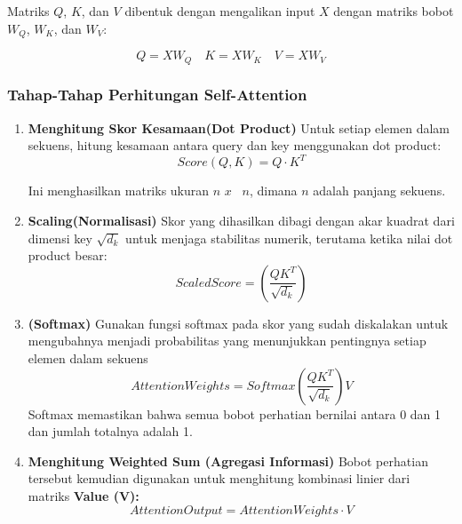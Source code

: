 Matriks \( Q \), \( K \), dan \( V \) dibentuk dengan mengalikan input \( X \) dengan matriks bobot \( W_Q \), \( W_K \), dan \( W_V \):

\begin{equation}
Q = XW_Q \quad K = XW_K \quad V = XW_V
\end{equation}

\subsubsection{Tahap-Tahap Perhitungan Self-Attention}
\begin{enumerate}
    \item \textbf{Menghitung Skor Kesamaan(Dot Product)}
    Untuk setiap elemen dalam sekuens, hitung kesamaan antara query dan key menggunakan dot product:
      \begin{equation}
        Score(Q,K) = Q \cdot K^{T}
      \end{equation}

    Ini menghasilkan matriks ukuran \( n \) \( x \) \ \( n \), dimana \( n \) adalah panjang sekuens.

    \item\textbf{Scaling(Normalisasi)}
    Skor yang dihasilkan dibagi dengan akar kuadrat dari dimensi key \(\sqrt{d_k} \)  untuk menjaga stabilitas numerik, terutama ketika nilai dot product besar:
    \begin{equation}
      Scaled Score = (\frac{QK^{T}}{\sqrt{d_{k}}})
    \end{equation}

    
    \item\textbf{(Softmax)}
    Gunakan fungsi softmax pada skor yang sudah diskalakan untuk mengubahnya menjadi probabilitas yang menunjukkan pentingnya setiap elemen dalam sekuens
    \begin{equation}
      Attention Weights = Softmax(\frac{QK^{T}}{\sqrt{d_{k}}})V
    \end{equation}
    Softmax memastikan bahwa semua bobot perhatian bernilai antara 0 dan 1 dan jumlah totalnya adalah 1.
    \item\textbf{Menghitung Weighted Sum (Agregasi Informasi)}
    Bobot perhatian tersebut kemudian digunakan untuk menghitung kombinasi linier dari matriks \textbf{Value (V):}
    \begin{equation}
      Attention Output = Attention Weights \cdot V
    \end{equation}
\end{enumerate}

